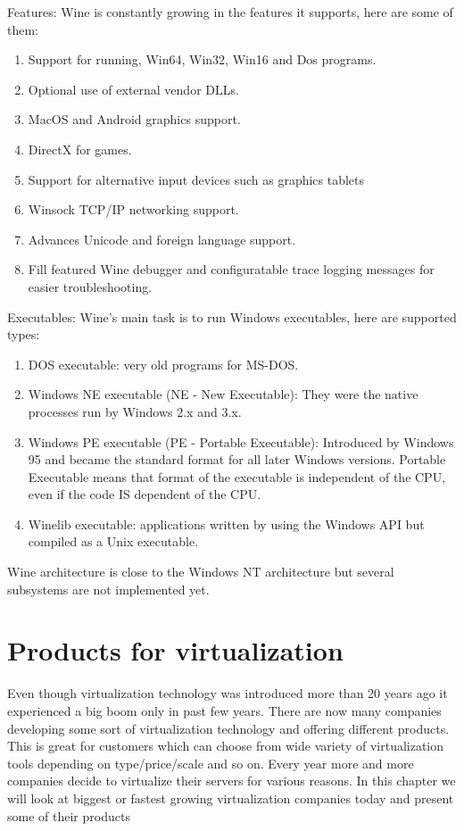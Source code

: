 Features:
Wine is constantly growing in the features it supports, here are some of them:
\begin{enumerate}
\item Support for running, Win64, Win32, Win16 and Dos programs.
\item Optional use of external vendor DLLs.
\item MacOS and Android graphics support.
\item DirectX for games.
\item Support for alternative input devices such as graphics tablets
\item Winsock TCP/IP networking support.
\item Advances Unicode and foreign language support.
\item Fill featured Wine debugger and configuratable trace logging messages for easier troubleshooting.
\end{enumerate}

Executables:
Wine's main task is to run Windows executables, here are supported types:
\begin{enumerate}
\item DOS executable: very old programs for MS-DOS.
\item Windows NE executable (NE - New Executable): They were the native processes run by Windows 2.x and 3.x.
\item Windows PE executable (PE - Portable Executable): Introduced by Windows 95 and became the standard format for all later Windows versions. Portable Executable means that format of the executable is independent of the CPU, even if the code IS dependent of the CPU.
\item Winelib executable: applications written by using the Windows API but compiled as a Unix executable.
\end{enumerate}

Wine architecture is close to the Windows NT architecture but several subsystems are not implemented yet.


\chapter{Products for virtualization} 
\label{chap_products}
Even though virtualization technology was introduced more than 20 years ago it experienced a big boom only in past few years. There are now many companies developing some sort of virtualization technology and offering different products. This is great for customers which can choose from wide variety of virtualization tools depending on type/price/scale and so on. Every year more and more companies decide to virtualize their servers for various reasons. In this chapter we will look at biggest or fastest growing virtualization companies today and present some of their products

